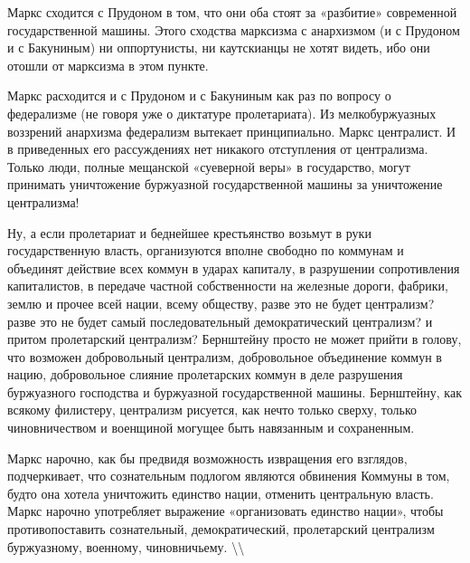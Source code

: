 \documentclass[12pt]{article}
\newcommand\ellipsis{%
  \textbackslash\thinspace\textellipsis\textbackslash
}
\newcommand{\parnum}{(\arabic{parcount})}
\newcounter{parcount}
\newenvironment{parnumbers}{%
  \par%
  \everypar{\noindent \stepcounter{parcount}\marginpar[]{\parnum}}%
}{}
\begin{document}
\begin{parnumbers}
Маркс сходится с Прудоном в том, что они оба стоят за «разбитие» современной государственной машины. Этого сходства марксизма с анархизмом (и с Прудоном и с Бакуниным) ни оппортунисты, ни каутскианцы не хотят видеть, ибо они отошли от марксизма в этом пункте.

Маркс расходится и с Прудоном и с Бакуниным как раз по вопросу о федерализме (не говоря уже о диктатуре пролетариата). Из мелкобуржуазных воззрений анархизма федерализм вытекает принципиально. Маркс централист. И в приведенных его рассуждениях нет никакого отступления от централизма. Только люди, полные мещанской «суеверной веры» в государство, могут принимать уничтожение буржуазной государственной машины за уничтожение централизма!

Ну, а если пролетариат и беднейшее крестьянство возьмут в руки государственную власть, организуются вполне свободно по коммунам и объединят действие всех коммун в ударах капиталу, в разрушении сопротивления капиталистов, в передаче частной собственности на железные дороги, фабрики, землю и прочее всей нации, всему обществу, разве это не будет централизм? разве это не будет самый последовательный демократический централизм? и притом пролетарский централизм? Бернштейну просто не может прийти в голову, что возможен добровольный централизм, добровольное объединение коммун в нацию, добровольное слияние пролетарских коммун в деле разрушения буржуазного господства и буржуазной государственной машины. Бернштейну, как всякому филистеру, централизм рисуется, как нечто только сверху, только чиновничеством и военщиной могущее быть навязанным и сохраненным.

Маркс нарочно, как бы предвидя возможность извращения его взглядов, подчеркивает, что сознательным подлогом являются обвинения Коммуны в том, будто она хотела уничтожить единство нации, отменить центральную власть. Маркс нарочно употребляет выражение «организовать единство нации», чтобы противопоставить сознательный, демократический, пролетарский централизм буржуазному, военному, чиновничьему. \ellipsis
\end{parnumbers}
\end{document}

